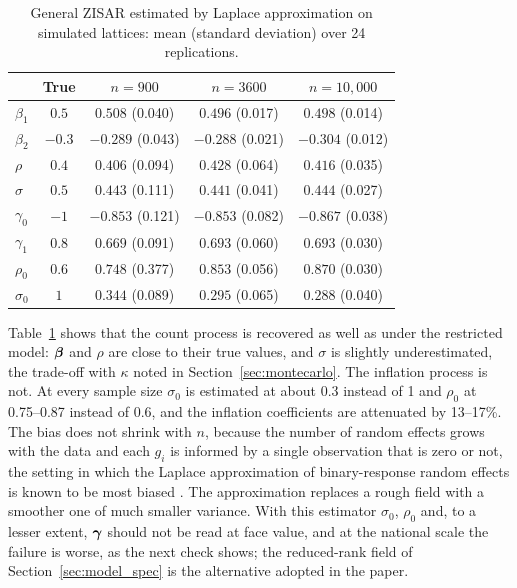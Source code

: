 \begin{table}[htbp]
\centering
\caption{General ZISAR estimated by Laplace approximation on simulated lattices: mean (standard deviation) over 24 replications.}\label{tab:general_mc}
\small
\begin{tabular}{lcccc}
\toprule
 & True & $n = 900$ & $n = 3600$ & $n = 10{,}000$ \\
\midrule
$\beta_1$   & $0.5$  & $0.508$ (0.040) & $0.496$ (0.017) & $0.498$ (0.014) \\
$\beta_2$   & $-0.3$ & $-0.289$ (0.043) & $-0.288$ (0.021) & $-0.304$ (0.012) \\
$\rho$      & $0.4$  & $0.406$ (0.094) & $0.428$ (0.064) & $0.416$ (0.035) \\
$\sigma$    & $0.5$  & $0.443$ (0.111) & $0.441$ (0.041) & $0.444$ (0.027) \\
$\gamma_0$  & $-1$   & $-0.853$ (0.121) & $-0.853$ (0.082) & $-0.867$ (0.038) \\
$\gamma_1$  & $0.8$  & $0.669$ (0.091) & $0.693$ (0.060) & $0.693$ (0.030) \\
$\rho_0$    & $0.6$  & $0.748$ (0.377) & $0.853$ (0.056) & $0.870$ (0.030) \\
$\sigma_0$  & $1$    & $0.344$ (0.089) & $0.295$ (0.065) & $0.288$ (0.040) \\
\bottomrule
\end{tabular}
\end{table}

Table~\ref{tab:general_mc} shows that the count process is recovered as well as under the restricted model: $\boldsymbol{\beta}$ and $\rho$ are close to their true values, and $\sigma$ is slightly underestimated, the trade-off with $\kappa$ noted in Section~\ref{sec:montecarlo}.
The inflation process is not.
At every sample size $\sigma_0$ is estimated at about 0.3 instead of 1 and $\rho_0$ at 0.75--0.87 instead of 0.6, and the inflation coefficients are attenuated by 13--17\%.
The bias does not shrink with $n$, because the number of random effects grows with the data and each $g_i$ is informed by a single observation that is zero or not, the setting in which the Laplace approximation of binary-response random effects is known to be most biased \citep{joe2008}.
The approximation replaces a rough field with a smoother one of much smaller variance.
With this estimator $\sigma_0$, $\rho_0$ and, to a lesser extent, $\boldsymbol{\gamma}$ should not be read at face value, and at the national scale the failure is worse, as the next check shows; the reduced-rank field of Section~\ref{sec:model_spec} is the alternative adopted in the paper.

